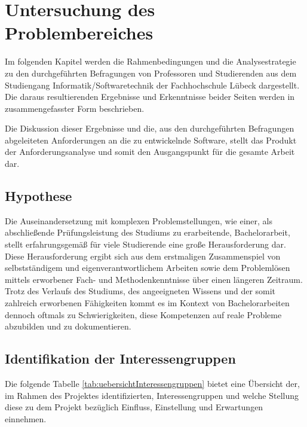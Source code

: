 \documentclass[bibliography=totoc,listof=totoc,BCOR=5mm,DIV=12,oneside]{scrbook}
\begin{document}
\newpage
\chapter{Untersuchung des Problembereiches} \label{chap:problemanalyse}
\par Im folgenden Kapitel werden die Rahmenbedingungen und die Analysestrategie zu den durchgeführten Befragungen von Professoren und Studierenden aus dem Studiengang Informatik/Softwaretechnik der Fachhochschule Lübeck dargestellt. Die daraus resultierenden Ergebnisse und Erkenntnisse beider Seiten werden in zusammengefasster Form beschrieben. 
\par Die Diskussion dieser Ergebnisse und die, aus den durchgeführten Befragungen abgeleiteten Anforderungen an die zu entwickelnde Software, stellt das Produkt der Anforderungsanalyse und somit den Ausgangspunkt für die gesamte Arbeit dar.

\section{Hypothese}
\par Die Auseinandersetzung mit komplexen Problemstellungen, wie einer, als abschließende Prüfungsleistung des Studiums zu erarbeitende, Bachelorarbeit, stellt erfahrungsgemäß für viele Studierende eine große Herausforderung dar. Diese Herausforderung ergibt sich aus dem erstmaligen Zusammenspiel von selbstständigem und eigenverantwortlichem Arbeiten sowie dem Problemlösen mittels erworbener Fach- und Methodenkenntnisse über einen längeren Zeitraum.
Trotz des Verlaufs des Studiums, des angeeigneten Wissens und der somit zahlreich erworbenen Fähigkeiten kommt es im Kontext von Bachelorarbeiten dennoch oftmals zu Schwierigkeiten, diese Kompetenzen auf reale Probleme abzubilden und zu dokumentieren.

\newpage
\section{Identifikation der Interessengruppen}
\par Die folgende Tabelle \ref{tab:uebersichtInteressengruppen} bietet eine Übersicht der, im Rahmen des Projektes identifizierten, Interessengruppen und welche Stellung diese zu dem Projekt bezüglich Einfluss, Einstellung und Erwartungen einnehmen.
\end{document}

